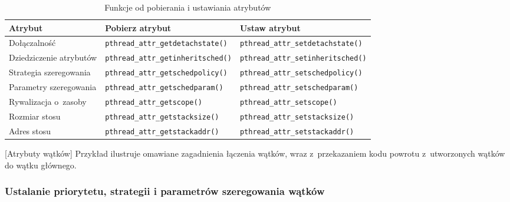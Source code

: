 \begin{table}[h!]
\centering
\caption{Funkcje od pobierania i ustawiania atrybutów}
\setlength{\arrayrulewidth}{1pt}
\setlength{\tabcolsep}{6pt}
\renewcommand{\arraystretch}{1.2}
\begin{tabular}{ |p{}|p{}|p{}| }
\hline \rowcolor{gray}
\textbf{Atrybut} & \textbf{Pobierz atrybut} & \textbf{Ustaw atrybut} \\ \hline
Dołączalność & \mbox{\lstinline[style=MyCStyle]{pthread_attr_getdetachstate()}} & \mbox{\lstinline[style=MyCStyle]{pthread_attr_setdetachstate()}} \\ \hline
Dziedziczenie atrybutów & \mbox{\lstinline[style=MyCStyle]{pthread_attr_getinheritsched()}} & \mbox{\lstinline[style=MyCStyle]{pthread_attr_setinheritsched()}} \\ \hline
Strategia szeregowania & \mbox{\lstinline[style=MyCStyle]{pthread_attr_getschedpolicy()}} & \mbox{\lstinline[style=MyCStyle]{pthread_attr_setschedpolicy()}} \\ \hline
Parametry szeregowania & \mbox{\lstinline[style=MyCStyle]{pthread_attr_getschedparam()}} & \mbox{\lstinline[style=MyCStyle]{pthread_attr_setschedparam()}} \\ \hline
Rywalizacja o~zasoby & \mbox{\lstinline[style=MyCStyle]{pthread_attr_getscope()}} & \mbox{\lstinline[style=MyCStyle]{pthread_attr_setscope()}} \\ \hline
Rozmiar stosu & \mbox{\lstinline[style=MyCStyle]{pthread_attr_getstacksize()}} & \mbox{\lstinline[style=MyCStyle]{pthread_attr_setstacksize()}} \\ \hline
Adres stosu & \mbox{\lstinline[style=MyCStyle]{pthread_attr_getstackaddr()}} & \mbox{\lstinline[style=MyCStyle]{pthread_attr_setstackaddr()}} \\ \hline
\end{tabular}
\label{tab:atrybuty2}
\end{table}


\begin{example}{[Atrybuty wątków]}
Przykład ilustruje omawiane zagadnienia łączenia wątków, wraz z~przekazaniem kodu powrotu z~utworzonych wątków do wątku głównego.


\end{example}

\subsubsection{Ustalanie priorytetu, strategii i parametrów szeregowania wątków}



